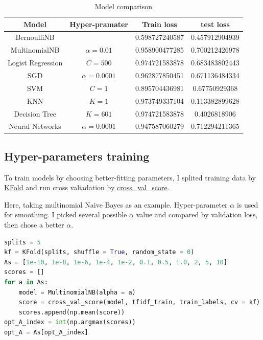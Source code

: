 \documentclass[a4paper]{article}
\begin{document}
\begin{table}[htbp]
\centering
\begin{tabular}{|c|c|c|c|}
    \hline
    Model & Hyper-pramater & Train loss & test loss\\
    \hline
    BernoulliNB &  & 0.598727240587 & 0.457912904939\\
    \hline
    MultinomialNB & $\alpha=0.01$ & 0.958900477285 & 0.700212426978\\
    \hline
    Logist Regression & $C=500$ & 0.974721583878 & 0.683483802443\\
    \hline
    SGD & $\alpha=0.0001$ & 0.962877850451 & 0.671136484334\\
    \hline
    SVM & $C=1$ & 0.895704436981 & 0.67750929368\\
    \hline
    KNN & $K=1$ & 0.973749337104 & 0.113382899628\\
    \hline
    Decision Tree & $K=601$ & 0.974721583878 & 0.4026818906\\
    \hline
    Neural Networks & $\alpha=0.0001$ & 0.947587060279 & 0.712294211365\\
    \hline
    \end{tabular}
\caption{Model comparison}
\label{tab: Model_comparison}
\end{table}

\subsection{Hyper-parameters training}

To train models by choosing better-fitting parameters, I splited training data by \href{http://scikit-learn.org/stable/modules/generated/sklearn.model_selection.KFold.html}{KFold} and run cross valiadation by \href{http://scikit-learn.org/stable/modules/generated/sklearn.model_selection.cross_val_score.html}{cross\_val\_score}.

Here, taking multinomial Naive Bayes as an example. Hyper-parameter $\alpha$ is used for smoothing. I picked several possible $\alpha$ value and compared by validation loss, then chose a better $\alpha$.

\begin{lstlisting}[language = Python]
splits = 5
kf = KFold(splits, shuffle = True, random_state = 0)
As = [1e-10, 1e-8, 1e-6, 1e-4, 1e-2, 0.1, 0.5, 1.0, 2, 5, 10]
scores = []
for a in As:
    model = MultinomialNB(alpha = a)
    score = cross_val_score(model, tfidf_train, train_labels, cv = kf)
    scores.append(np.mean(score))
opt_A_index = int(np.argmax(scores))
opt_A = As[opt_A_index]
\end{lstlisting}
\end{document}
